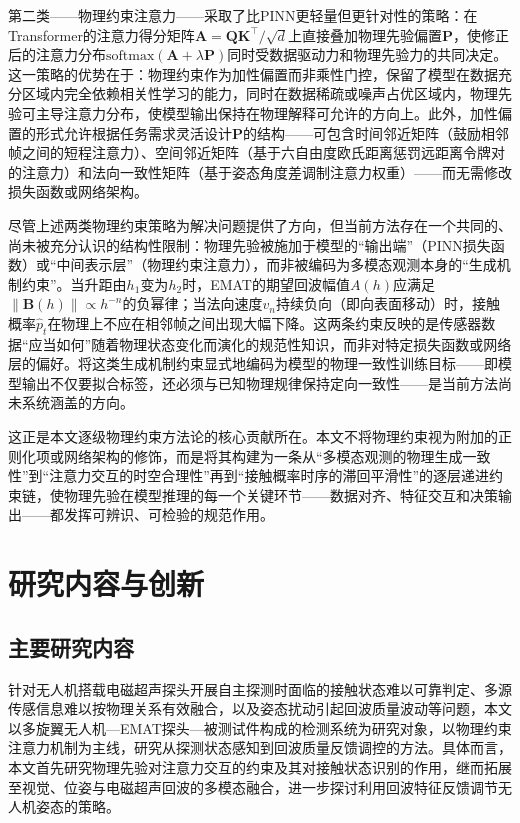 第二类——物理约束注意力——采取了比PINN更轻量但更针对性的策略：在Transformer的注意力得分矩阵$\mathbf{A} = \mathbf{Q}\mathbf{K}^\top / \sqrt{d}$上直接叠加物理先验偏置$\mathbf{P}$，使修正后的注意力分布$\text{softmax}(\mathbf{A} + \lambda\mathbf{P})$同时受数据驱动力和物理先验力的共同决定。这一策略的优势在于：物理约束作为加性偏置而非乘性门控，保留了模型在数据充分区域内完全依赖相关性学习的能力，同时在数据稀疏或噪声占优区域内，物理先验可主导注意力分布，使模型输出保持在物理解释可允许的方向上。此外，加性偏置的形式允许根据任务需求灵活设计$\mathbf{P}$的结构——可包含时间邻近矩阵（鼓励相邻帧之间的短程注意力）、空间邻近矩阵（基于六自由度欧氏距离惩罚远距离令牌对的注意力）和法向一致性矩阵（基于姿态角度差调制注意力权重）——而无需修改损失函数或网络架构。

尽管上述两类物理约束策略为解决问题提供了方向，但当前方法存在一个共同的、尚未被充分认识的结构性限制：物理先验被施加于模型的“输出端”（PINN损失函数）或“中间表示层”（物理约束注意力），而非被编码为多模态观测本身的“生成机制约束”。当升距由$h_1$变为$h_2$时，EMAT的期望回波幅值$A(h)$应满足$\|\mathbf{B}(h)\| \propto h^{-n}$的负幂律；当法向速度$v_n$持续负向（即向表面移动）时，接触概率$\hat{p}_t$在物理上不应在相邻帧之间出现大幅下降。这两条约束反映的是传感器数据“应当如何”随着物理状态变化而演化的规范性知识，而非对特定损失函数或网络层的偏好。将这类生成机制约束显式地编码为模型的物理一致性训练目标——即模型输出不仅要拟合标签，还必须与已知物理规律保持定向一致性——是当前方法尚未系统涵盖的方向。

这正是本文逐级物理约束方法论的核心贡献所在。本文不将物理约束视为附加的正则化项或网络架构的修饰，而是将其构建为一条从“多模态观测的物理生成一致性”到“注意力交互的时空合理性”再到“接触概率时序的滞回平滑性”的逐层递进约束链，使物理先验在模型推理的每一个关键环节——数据对齐、特征交互和决策输出——都发挥可辨识、可检验的规范作用。

\section{研究内容与创新}


\subsection{主要研究内容}

针对无人机搭载电磁超声探头开展自主探测时面临的接触状态难以可靠判定、多源传感信息难以按物理关系有效融合，以及姿态扰动引起回波质量波动等问题，本文以多旋翼无人机—EMAT探头—被测试件构成的检测系统为研究对象，以物理约束注意力机制为主线，研究从探测状态感知到回波质量反馈调控的方法。具体而言，本文首先研究物理先验对注意力交互的约束及其对接触状态识别的作用，继而拓展至视觉、位姿与电磁超声回波的多模态融合，进一步探讨利用回波特征反馈调节无人机姿态的策略。

